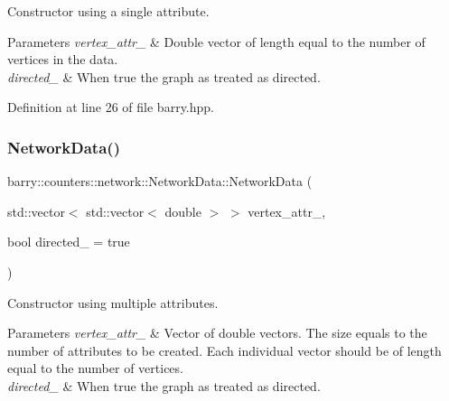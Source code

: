 Constructor using a single attribute. 


\begin{DoxyParams}{Parameters}
{\em vertex\+\_\+attr\+\_\+} & Double vector of length equal to the number of vertices in the data. \\
\hline
{\em directed\+\_\+} & When {\ttfamily true} the graph as treated as directed. \\
\hline
\end{DoxyParams}


Definition at line 26 of file barry.\+hpp.

\mbox{\label{classbarry_1_1counters_1_1network_1_1_network_data_ac37270f77de515f8a60a18b75a5bb60d}} 
\subsubsection{\texorpdfstring{Network\+Data()}{NetworkData()}\hspace{0.1cm}{\footnotesize\ttfamily [3/3]}}
{\footnotesize\ttfamily barry\+::counters\+::network\+::\+Network\+Data\+::\+Network\+Data (\begin{DoxyParamCaption}\item[{std\+::vector$<$ std\+::vector$<$ double $>$ $>$}]{vertex\+\_\+attr\+\_\+,  }\item[{bool}]{directed\+\_\+ = {\ttfamily true} }\end{DoxyParamCaption})\hspace{0.3cm}{\ttfamily [inline]}}



Constructor using multiple attributes. 


\begin{DoxyParams}{Parameters}
{\em vertex\+\_\+attr\+\_\+} & Vector of double vectors. The size equals to the number of attributes to be created. Each individual vector should be of length equal to the number of vertices. \\
\hline
{\em directed\+\_\+} & When {\ttfamily true} the graph as treated as directed. \\
\hline
\end{DoxyParams}


